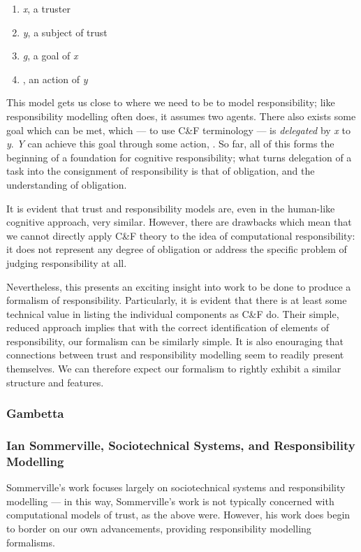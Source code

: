 \begin{enumerate}
    \item \emph{x}, a truster
    \item \emph{y}, a subject of trust
    \item \emph{g}, a goal of \emph{x}
    \item \emph{\safealpha}, an action of \emph{y}
\end{enumerate}\par

This model gets us close to where we need to be to model responsibility; like responsibility modelling often does, it assumes two agents. There also exists some goal which can be met, which --- to use C\&F terminology --- is \emph{delegated} by \emph{x} to \emph{y}. \emph{Y} can achieve this goal through some action, \emph{\safealpha}. So far, all of this forms the beginning of a foundation for cognitive responsibility; what turns delegation of a task into the consignment of responsibility is that of obligation, and the understanding of obligation. \par

It is evident that trust and responsibility models are, even in the human-like cognitive approach, very similar. However, there are drawbacks which mean that we cannot directly apply C\&F theory to the idea of computational responsibility: it does not represent any degree of obligation or address the specific problem of judging responsibility at all.\par

Nevertheless, this presents an exciting insight into work to be done to produce a formalism of responsibility. Particularly, it is evident that there is at least some technical value in listing the individual components as C\&F do. Their simple, reduced approach implies that with the correct identification of elements of responsibility, our formalism can be similarly simple. It is also enouraging that connections between trust and responsibility modelling seem to readily present themselves. We can therefore expect our formalism to rightly exhibit a similar structure and features.\par

\subsubsection{Gambetta}

\subsubsection{Ian Sommerville, Sociotechnical Systems, and Responsibility Modelling}
Sommerville's work focuses largely on sociotechnical systems and responsibility modelling --- in this way, Sommerville's work is not typically concerned with computational models of trust, as the above were. However, his work does begin to border on our own advancements, providing responsibility modelling formalisms.\par

